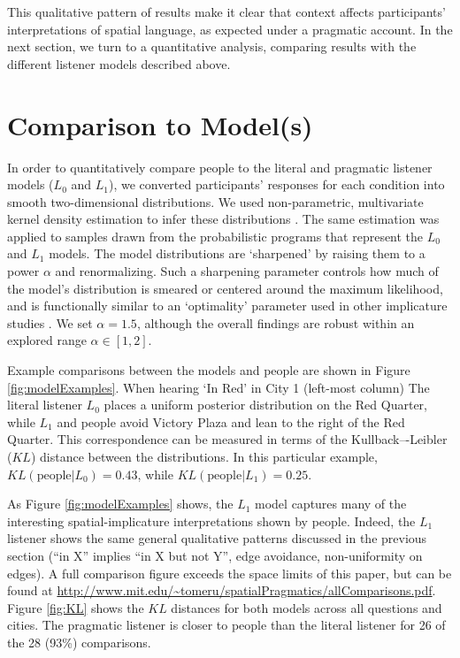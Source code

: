 \documentclass[10pt,letterpaper]{article}
\begin{document}
This qualitative pattern of results make it clear that context affects participants' interpretations of spatial language, as expected under a pragmatic account. In the next section, we turn to a quantitative analysis, comparing results with the different listener models described above. 

\section{Comparison to Model(s)}

In order to quantitatively compare people to the literal and pragmatic listener models ($L_0$ and $L_1$), we converted participants' responses for each condition into smooth two-dimensional distributions. We used non-parametric, multivariate kernel density estimation to infer these distributions \cite{epanechnikov1969non}. The same estimation was applied to samples drawn from the probabilistic programs that represent the $L_0$ and $L_1$ models. The model distributions are `sharpened' by raising them to a power $\alpha$ and renormalizing. Such a sharpening parameter controls how much of the model's distribution is smeared or centered around the maximum likelihood, and is functionally similar to an `optimality' parameter used in other implicature studies \cite{ndg+ast:topics2013,kao2014}. We set $\alpha=1.5$, although the overall findings are robust within an explored range $\alpha \in [1,2]$. 

Example comparisons between the models and people are shown in Figure \ref{fig:modelExamples}. When hearing `In Red' in City 1 (left-most column) The literal listener $L_0$ places a uniform posterior distribution on the Red Quarter, while $L_1$ and people avoid Victory Plaza and lean to the right of the Red Quarter. This correspondence can be measured in terms of the Kullback–-Leibler ($KL$) distance between the distributions. In this particular example, $KL(\text{people} | L_0) = 0.43$, while $KL(\text{people} | L_1) = 0.25$. 

As Figure \ref{fig:modelExamples} shows, the $L_1$ model captures many of the interesting spatial-implicature interpretations shown by people.
Indeed, the $L_1$ listener shows the same general qualitative patterns discussed in the previous section (``in X'' implies ``in X but not Y'', edge avoidance, non-uniformity on edges). A full comparison figure exceeds the space limits of this paper, but can be found at \url{http://www.mit.edu/~tomeru/spatialPragmatics/allComparisons.pdf}. Figure \ref{fig:KL} shows the $KL$ distances for both models across all questions and cities. The pragmatic listener is closer to people than the literal listener for 26 of the 28 (93\%) comparisons. 
\end{document}
